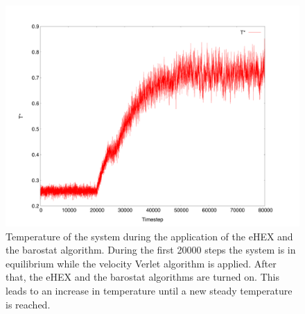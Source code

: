 \documentclass[12pt]{article}
\begin{document}
\begin{figure}[h]
    \begin{center}
        \includegraphics[scale=0.4]{images/baro_temp_start.pdf}
        \caption{Temperature of the system during the application of the eHEX and the barostat algorithm. During the first 20000 steps the system is
        in equilibrium while the velocity Verlet algorithm is applied. After that, the eHEX and the barostat algorithms are turned on. This leads to
    an increase in temperature until a new steady temperature is reached.}
        \label{fig:baro1}
    \end{center}
\end{figure}
\end{document}
